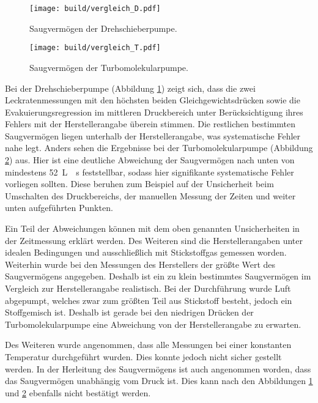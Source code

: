 \begin{figure}
  \centering
  \texttt{[image: build/vergleich\_D.pdf]}
  \caption{Saugvermögen der Drehschieberpumpe.}
  \label{fig:vgl_D}
\end{figure}
\begin{figure}
  \centering
  \texttt{[image: build/vergleich\_T.pdf]}
  \caption{Saugvermögen der Turbomolekularpumpe.}
  \label{fig:vgl_T}
\end{figure}
\FloatBarrier

Bei der Drehschieberpumpe (Abbildung \ref{fig:vgl_D}) zeigt sich,
dass die zwei Leckratenmessungen mit den
höchsten beiden Gleichgewichtsdrücken sowie die Evakuierungsregression im
mittleren Druckbereich unter Berücksichtigung ihres Fehlers mit der Herstellerangabe
überein stimmen. Die restlichen bestimmten Saugvermögen liegen unterhalb der
Herstellerangabe, was systematische Fehler nahe legt.
Anders sehen die Ergebnisse bei der Turbomolekularpumpe
(Abbildung \ref{fig:vgl_T}) aus. Hier ist eine deutliche Abweichung der
Saugvermögen nach unten von mindestens \SI{52}{\liter{}\second}
feststellbar, sodass hier signifikante systematische Fehler vorliegen sollten.
Diese beruhen zum Beispiel auf der Unsicherheit beim Umschalten des Druckbereichs,
der manuellen Messung der Zeiten und weiter unten aufgeführten Punkten.

Ein Teil der Abweichungen können mit dem oben genannten Unsicherheiten in
der Zeitmessung erklärt werden. Des Weiteren sind die Herstellerangaben
unter idealen Bedingungen und ausschließlich mit Stickstoffgas gemessen
worden. Weiterhin wurde bei den Messungen des Herstellers der größte
Wert des Saugvermögens angegeben. Deshalb ist ein zu klein bestimmtes
Saugvermögen im Vergleich zur Herstellerangabe realistisch. Bei der
Durchführung wurde Luft abgepumpt, welches zwar zum größten Teil aus
Stickstoff besteht, jedoch ein Stoffgemisch ist.
Deshalb ist gerade bei den niedrigen Drücken der Turbomolekularpumpe eine
Abweichung von der Herstellerangabe zu erwarten.

Des Weiteren wurde angenommen, dass alle Messungen bei einer konstanten
Temperatur durchgeführt wurden. Dies konnte jedoch nicht sicher gestellt werden.
In der Herleitung des Saugvermögens ist auch angenommen worden, dass das
Saugvermögen unabhängig vom Druck ist. Dies kann nach den Abbildungen
\ref{fig:vgl_D} und \ref{fig:vgl_T} ebenfalls nicht bestätigt werden.

